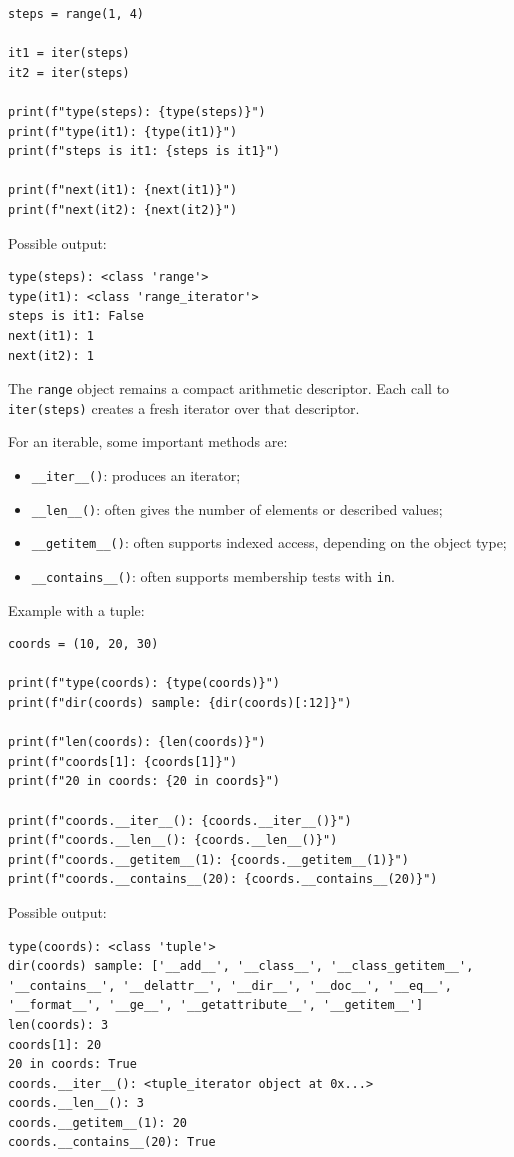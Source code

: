 \begin{verbatim}
steps = range(1, 4)

it1 = iter(steps)
it2 = iter(steps)

print(f"type(steps): {type(steps)}")
print(f"type(it1): {type(it1)}")
print(f"steps is it1: {steps is it1}")

print(f"next(it1): {next(it1)}")
print(f"next(it2): {next(it2)}")
\end{verbatim}

Possible output:

\begin{verbatim}
type(steps): <class 'range'>
type(it1): <class 'range_iterator'>
steps is it1: False
next(it1): 1
next(it2): 1
\end{verbatim}

The \texttt{range} object remains a compact arithmetic descriptor. Each call to \texttt{iter(steps)} creates a fresh iterator over that descriptor.

For an iterable, some important methods are:

\begin{itemize}
    \item \texttt{\_\_iter\_\_()}: produces an iterator;
    \item \texttt{\_\_len\_\_()}: often gives the number of elements or described values;
    \item \texttt{\_\_getitem\_\_()}: often supports indexed access, depending on the object type;
    \item \texttt{\_\_contains\_\_()}: often supports membership tests with \texttt{in}.
\end{itemize}

Example with a tuple:

\begin{verbatim}
coords = (10, 20, 30)

print(f"type(coords): {type(coords)}")
print(f"dir(coords) sample: {dir(coords)[:12]}")

print(f"len(coords): {len(coords)}")
print(f"coords[1]: {coords[1]}")
print(f"20 in coords: {20 in coords}")

print(f"coords.__iter__(): {coords.__iter__()}")
print(f"coords.__len__(): {coords.__len__()}")
print(f"coords.__getitem__(1): {coords.__getitem__(1)}")
print(f"coords.__contains__(20): {coords.__contains__(20)}")
\end{verbatim}

Possible output:

\begin{verbatim}
type(coords): <class 'tuple'>
dir(coords) sample: ['__add__', '__class__', '__class_getitem__',
'__contains__', '__delattr__', '__dir__', '__doc__', '__eq__',
'__format__', '__ge__', '__getattribute__', '__getitem__']
len(coords): 3
coords[1]: 20
20 in coords: True
coords.__iter__(): <tuple_iterator object at 0x...>
coords.__len__(): 3
coords.__getitem__(1): 20
coords.__contains__(20): True
\end{verbatim}


